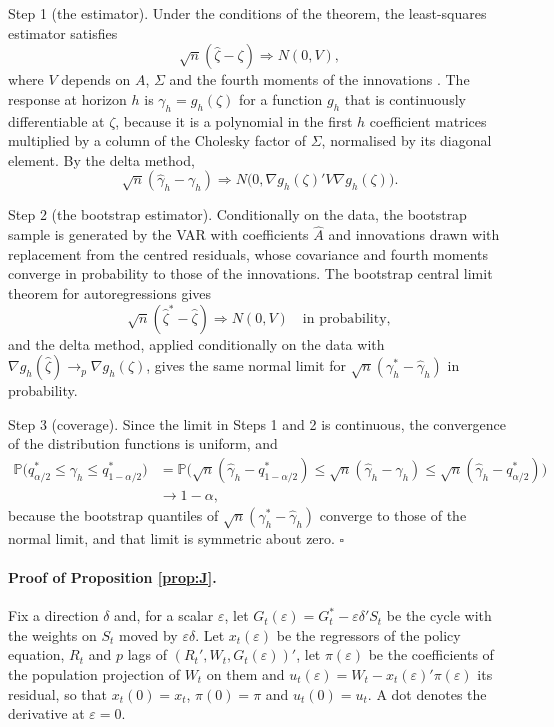 \documentclass[12pt,a4paper]{article}
\theoremstyle{definition}
\begin{document}
Step 1 (the estimator). Under the conditions of the theorem, the least-squares estimator satisfies
\[
\sqrt n(\hat\zeta-\zeta)\Rightarrow N(0,V),
\]
where $V$ depends on $A$, $\Sigma$ and the fourth moments of the innovations \citep[Chapter 12]{KilianLutkepohl2017}. The response at horizon $h$ is $\gamma_h=g_h(\zeta)$ for a function $g_h$ that is continuously differentiable at $\zeta$, because it is a polynomial in the first $h$ coefficient matrices multiplied by a column of the Cholesky factor of $\Sigma$, normalised by its diagonal element. By the delta method,
\[
\sqrt n(\hat\gamma_h-\gamma_h)\Rightarrow N\big(0,\nabla g_h(\zeta)'V\nabla g_h(\zeta)\big).
\]

Step 2 (the bootstrap estimator). Conditionally on the data, the bootstrap sample is generated by the VAR with coefficients $\hat A$ and innovations drawn with replacement from the centred residuals, whose covariance and fourth moments converge in probability to those of the innovations. The bootstrap central limit theorem for autoregressions \citep{Bose1988,KilianLutkepohl2017} gives
\[
\sqrt n(\hat\zeta^\ast-\hat\zeta)\Rightarrow N(0,V)\quad\text{in probability},
\]
and the delta method, applied conditionally on the data with $\nabla g_h(\hat\zeta)\to_p\nabla g_h(\zeta)$, gives the same normal limit for $\sqrt n(\gamma_h^\ast-\hat\gamma_h)$ in probability.

Step 3 (coverage). Since the limit in Steps 1 and 2 is continuous, the convergence of the distribution functions is uniform, and
\[
\begin{aligned}
\mathbb P\big(q^\ast_{\alpha/2}\leq\gamma_h\leq q^\ast_{1-\alpha/2}\big)&=\mathbb P\big(\sqrt n(\hat\gamma_h-q^\ast_{1-\alpha/2})\leq\sqrt n(\hat\gamma_h-\gamma_h)\leq\sqrt n(\hat\gamma_h-q^\ast_{\alpha/2})\big)\\
&\to1-\alpha,
\end{aligned}
\]
because the bootstrap quantiles of $\sqrt n(\gamma^\ast_h-\hat\gamma_h)$ converge to those of the normal limit, and that limit is symmetric about zero. $\square$

\paragraph{Proof of Proposition \ref{prop:J}.} Fix a direction $\delta$ and, for a scalar $\varepsilon$, let $G_t(\varepsilon)=G^\ast_t-\varepsilon\delta'S_t$ be the cycle with the weights on $S_t$ moved by $\varepsilon\delta$. Let $x_t(\varepsilon)$ be the regressors of the policy equation, $R_t$ and $p$ lags of $(R_t',W_t,G_t(\varepsilon))'$, let $\pi(\varepsilon)$ be the coefficients of the population projection of $W_t$ on them and $u_t(\varepsilon)=W_t-x_t(\varepsilon)'\pi(\varepsilon)$ its residual, so that $x_t(0)=x_t$, $\pi(0)=\pi$ and $u_t(0)=u_t$. A dot denotes the derivative at $\varepsilon=0$.
\end{document}
